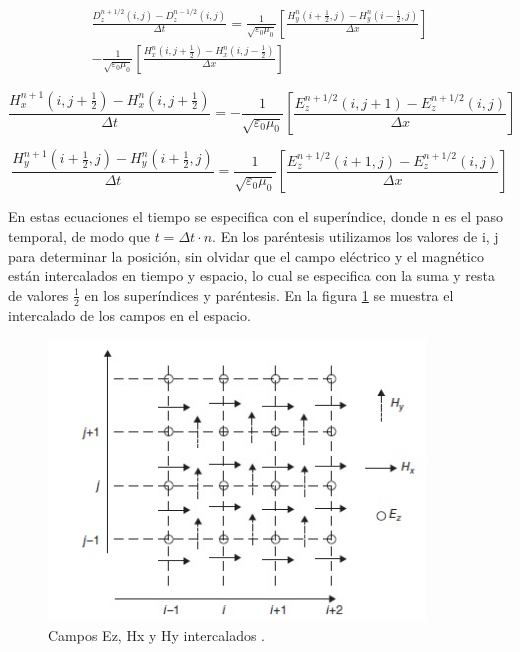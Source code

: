 \documentclass[11pt,a4paper,twoside,pdf]{article}
\numberwithin{equation}{section}
\begin{document}
\begin{equation}
\begin{split}
\frac{D^{n+1/2}_{z}(i,j)-D^{n-1/2}_{z}(i,j)}{\Delta t}=\frac{1}{\sqrt{\varepsilon_{0}\mu_{0}}}\left[\frac{H^{n}_{y}(i+\frac{1}{2},j)-H^{n}_{y}(i-\frac{1}{2},j)}{\Delta x}\right]  \\
-\frac{1}{\sqrt{\varepsilon_{0}\mu_{0}}}\left[\frac{H^{n}_{x}(i,j+\frac{1}{2})-H^{n}_{x}(i,j-\frac{1}{2})}{\Delta x}\right] 
\end{split}
\end{equation}

\begin{equation}
\frac{H^{n+1}_{x}(i,j+\frac{1}{2})-H^{n}_{x}(i,j+\frac{1}{2})}{\Delta t}=-\frac{1}{\sqrt{\varepsilon_{0}\mu_{0}}}\left[\frac{E^{n+1/2}_{z}(i,j+1)-E^{n+1/2}_{z}(i,j)}{\Delta x}\right] 
\end{equation}

\begin{equation} 
\frac{H^{n+1}_{y}(i+\frac{1}{2},j)-H^{n}_{y}(i+\frac{1}{2},j)}{\Delta t}=\frac{1}{\sqrt{\varepsilon_{0}\mu_{0}}}\left[\frac{E^{n+1/2}_{z}(i+1,j)-E^{n+1/2}_{z}(i,j)}{\Delta x}\right] 
\end{equation}

En estas ecuaciones el tiempo se especifica con el superíndice, donde n es el paso temporal, de modo que $t=\Delta t\cdot n$. En los paréntesis utilizamos los valores de i, j para determinar la posición, sin olvidar que el campo eléctrico y el magnético están intercalados en tiempo y espacio, lo cual se especifica con la suma y resta de valores $\frac{1}{2}$ en los superíndices y paréntesis. En la figura \ref{fig:EyH_intercalados} se muestra el intercalado de los campos en el espacio.

\begin{figure}[h]
\centering
\includegraphics[width=10cm]{Interleaving_E_H.jpg}				
\caption{Campos Ez, Hx y Hy intercalados \cite{Houle2020}. }
\label{fig:EyH_intercalados}
\end{figure}
\noindent
\end{document}
